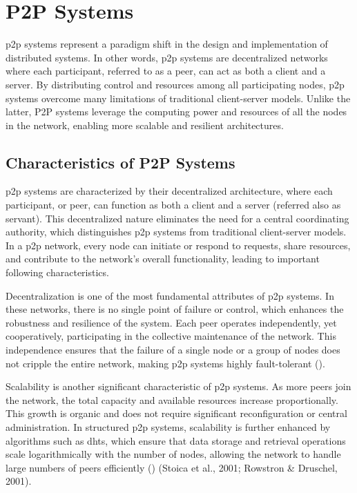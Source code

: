 \chapter{P2P Systems}\label{chap:p2p}
\gls{p2p} systems represent a paradigm shift in the design and implementation of distributed systems.
In other words, \gls{p2p} systems are decentralized networks where each participant, referred to as a peer, can act as both a client and a server.
By distributing control and resources among all participating nodes, \gls{p2p} systems overcome many limitations of traditional client-server models.
Unlike the latter, P2P systems leverage the computing power and resources of all the nodes in the network, enabling more scalable and resilient architectures.

\section{Characteristics of P2P Systems}
\gls{p2p} systems are characterized by their decentralized architecture, where each participant, or peer, can function as both a client and a server (referred also as servant).
This decentralized nature eliminates the need for a central coordinating authority, which distinguishes \gls{p2p} systems from traditional client-server models.
In a \gls{p2p} network, every node can initiate or respond to requests, share resources, and contribute to the network's overall functionality, leading to important following characteristics.

Decentralization is one of the most fundamental attributes of \gls{p2p} systems.
In these networks, there is no single point of failure or control, which enhances the robustness and resilience of the system.
Each peer operates independently, yet cooperatively, participating in the collective maintenance of the network.
This independence ensures that the failure of a single node or a group of nodes does not cripple the entire network, making \gls{p2p} systems highly fault-tolerant (\cite{singh2020}).

Scalability is another significant characteristic of \gls{p2p} systems.
As more peers join the network, the total capacity and available resources increase proportionally.
This growth is organic and does not require significant reconfiguration or central administration.
In structured \gls{p2p} systems, scalability is further enhanced by algorithms such as \glspl{dht}, which ensure that data storage and retrieval operations scale logarithmically with the number of nodes, allowing the network to handle large numbers of peers efficiently (\cite{singh2020}) (Stoica et al., 2001; Rowstron \& Druschel, 2001).

